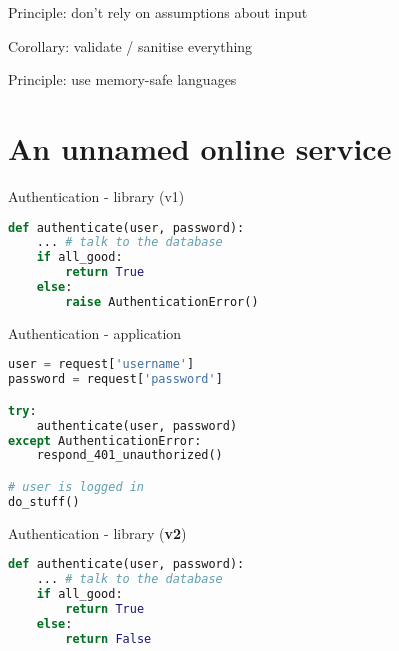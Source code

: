 \documentclass[ignorenonframetext,aspectratio=169,dvipsnames]{beamer}
\begin{document}
\begin{frame}[plain]
\huge
Principle: don't rely on assumptions about input
\pause

\Large Corollary: validate / sanitise everything
\end{frame}



\begin{frame}[plain]
\huge
Principle: use memory-safe languages
\end{frame}





\section{An unnamed online service}\label{unnamed}

\begin{frame}[fragile]{Authentication - library (v1)}
\begin{lstlisting}[language=Python]
def authenticate(user, password):
    ... # talk to the database
    if all_good:
        return True
    else:
        raise AuthenticationError()
\end{lstlisting}
\end{frame}

\begin{frame}[fragile]{Authentication - application}
\begin{lstlisting}[language=Python]
user = request['username']
password = request['password']

try:
    authenticate(user, password)
except AuthenticationError:
    respond_401_unauthorized()

# user is logged in
do_stuff()
\end{lstlisting}
\end{frame}

\begin{frame}[fragile]{Authentication - library (\textbf{v2})}
\begin{lstlisting}[language=Python]
def authenticate(user, password):
    ... # talk to the database
    if all_good:
        return True
    else:
        return False
\end{lstlisting}
\end{frame}
\end{document}
